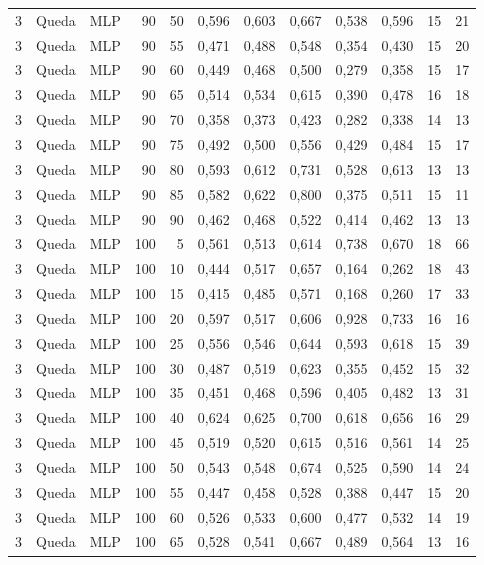 \begin{longtable}{@{}rllrrrrrrrrr@{}}
3 & Queda & MLP & 90 & 50 & 0,596 & 0,603 & 0,667 & 0,538 & 0,596 & 15 & 21 \\
3 & Queda & MLP & 90 & 55 & 0,471 & 0,488 & 0,548 & 0,354 & 0,430 & 15 & 20 \\
3 & Queda & MLP & 90 & 60 & 0,449 & 0,468 & 0,500 & 0,279 & 0,358 & 15 & 17 \\
3 & Queda & MLP & 90 & 65 & 0,514 & 0,534 & 0,615 & 0,390 & 0,478 & 16 & 18 \\
3 & Queda & MLP & 90 & 70 & 0,358 & 0,373 & 0,423 & 0,282 & 0,338 & 14 & 13 \\
3 & Queda & MLP & 90 & 75 & 0,492 & 0,500 & 0,556 & 0,429 & 0,484 & 15 & 17 \\
3 & Queda & MLP & 90 & 80 & 0,593 & 0,612 & 0,731 & 0,528 & 0,613 & 13 & 13 \\
3 & Queda & MLP & 90 & 85 & 0,582 & 0,622 & 0,800 & 0,375 & 0,511 & 15 & 11 \\
3 & Queda & MLP & 90 & 90 & 0,462 & 0,468 & 0,522 & 0,414 & 0,462 & 13 & 13 \\
3 & Queda & MLP & 100 & 5 & 0,561 & 0,513 & 0,614 & 0,738 & 0,670 & 18 & 66 \\
3 & Queda & MLP & 100 & 10 & 0,444 & 0,517 & 0,657 & 0,164 & 0,262 & 18 & 43 \\
3 & Queda & MLP & 100 & 15 & 0,415 & 0,485 & 0,571 & 0,168 & 0,260 & 17 & 33 \\
3 & Queda & MLP & 100 & 20 & 0,597 & 0,517 & 0,606 & 0,928 & 0,733 & 16 & 16 \\
3 & Queda & MLP & 100 & 25 & 0,556 & 0,546 & 0,644 & 0,593 & 0,618 & 15 & 39 \\
3 & Queda & MLP & 100 & 30 & 0,487 & 0,519 & 0,623 & 0,355 & 0,452 & 15 & 32 \\
3 & Queda & MLP & 100 & 35 & 0,451 & 0,468 & 0,596 & 0,405 & 0,482 & 13 & 31 \\
3 & Queda & MLP & 100 & 40 & 0,624 & 0,625 & 0,700 & 0,618 & 0,656 & 16 & 29 \\
3 & Queda & MLP & 100 & 45 & 0,519 & 0,520 & 0,615 & 0,516 & 0,561 & 14 & 25 \\
3 & Queda & MLP & 100 & 50 & 0,543 & 0,548 & 0,674 & 0,525 & 0,590 & 14 & 24 \\
3 & Queda & MLP & 100 & 55 & 0,447 & 0,458 & 0,528 & 0,388 & 0,447 & 15 & 20 \\
3 & Queda & MLP & 100 & 60 & 0,526 & 0,533 & 0,600 & 0,477 & 0,532 & 14 & 19 \\
3 & Queda & MLP & 100 & 65 & 0,528 & 0,541 & 0,667 & 0,489 & 0,564 & 13 & 16 \\

\end{longtable}

